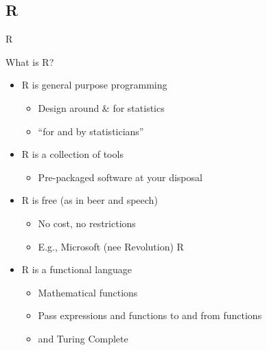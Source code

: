 \documentclass[
  ignorenonframetext,
]{beamer}
\providecommand{\tightlist}{%
  \setlength{\itemsep}{0pt}\setlength{\parskip}{0pt}}
\begin{document}
\hypertarget{r}{%
\subsection{R}\label{r}}

\begin{frame}{R}

\end{frame}

\begin{frame}{What is R?}
\protect\hypertarget{what-is-r}{}

\begin{itemize}[<+->]
\tightlist
\item
  R is general purpose programming

  \begin{itemize}[<+->]
  \tightlist
  \item
    Design around \& for statistics
  \item
    ``for and by statisticians''
  \end{itemize}
\item
  R is a collection of tools

  \begin{itemize}[<+->]
  \tightlist
  \item
    Pre-packaged software at your disposal
  \end{itemize}
\item
  R is free (as in beer and speech)

  \begin{itemize}[<+->]
  \tightlist
  \item
    No cost, no restrictions
  \item
    E.g., Microsoft (nee Revolution) R
  \end{itemize}
\item
  R is a functional language

  \begin{itemize}[<+->]
  \tightlist
  \item
    Mathematical functions
  \item
    Pass expressions and functions to and from functions
  \item
    and Turing Complete
  \end{itemize}
\end{itemize}

\end{frame}
\end{document}
